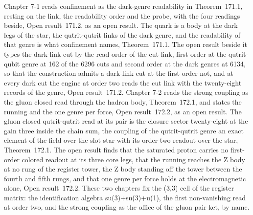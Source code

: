 Chapter 7-1 reads confinement as the dark-genre readability in Theorem~171.1, resting on the link, the readability order and the probe, with the four readings beside, Open result~171.2, as an open result. The quark is a body at the dark legs of the star, the qutrit-qutrit links of the dark genre, and the readability of that genre is what confinement names, Theorem~171.1. The open result beside it types the dark-link cut by the read order of the cut link, first order at the qutrit-qubit genre at 162 of the 6296 cuts and second order at the dark genres at 6134, so that the construction admits a dark-link cut at the first order not, and at every dark cut the engine at order two reads the cut link with the twenty-eight records of the genre, Open result~171.2. Chapter 7-2 reads the strong coupling as the gluon closed read through the hadron body, Theorem~172.1, and states the running and the one genre per force, Open result~172.2, as an open result. The gluon closed qutrit-qutrit read at its pair is the closure sector twenty-eight at the gain three inside the chain sum, the coupling of the qutrit-qutrit genre an exact element of the field over the slot star with its order-two readout over the star, Theorem~172.1. The open result finds that the saturated proton carries no first-order colored readout at its three core legs, that the running reaches the Z body at no rung of the register tower, the Z body standing off the tower between the fourth and fifth rungs, and that one genre per force holds at the electromagnetic alone, Open result~172.2. These two chapters fix the (3,3) cell of the register matrix: the identification algebra su(3)+su(3)+u(1), the first non-vanishing read at order two, and the strong coupling as the office of the gluon pair ket, by name.

